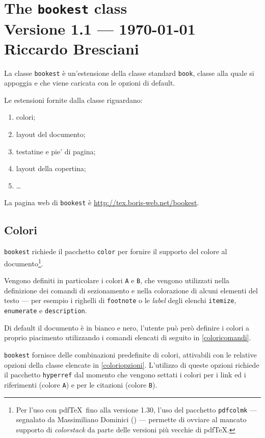\documentclass[a4paper,oneside,centered,noparindent,noparskip]{bookest}
\begin{document}
 \chapter*{The \texttt{bookest} class\\{\Large Versione 1.1 --- \today}\\{\Large Riccardo Bresciani}}
La classe \texttt{bookest} è un'estensione della classe standard \texttt{book}, classe alla quale si appoggia e che viene caricata con le opzioni di default.

\ppar
Le estensioni fornite dalla classe riguardano:
\begin{enumerate}
 \item colori;
 \item layout del documento;
 \item testatine e pie' di pagina;
 \item layout della copertina;
 \item \dots
\end{enumerate}

La pagina web di \texttt{bookest} è \url{http://tex.boris-web.net/bookest}.

\section{Colori}
\texttt{bookest} richiede il pacchetto \texttt{color} per fornire il supporto del colore al documento\footnote{Per l'uso con pdf\TeX\ fino alla versione 1.30, l'uso del pacchetto \texttt{pdfcolmk} --- segnalato da Massimiliano Dominici (\GuIT) --- permette di ovviare al mancato supporto di \emph{colorstack} da parte delle versioni più vecchie di pdf\TeX.}.

\ppar
Vengono definiti in particolare i colori \texttt{A} e \texttt{B}, che vengono utilizzati nella definizione dei comandi di sezionamento e nella colorazione di alcuni elementi del testo --- per esempio i righelli di \texttt{footnote} o le \emph{label} degli elenchi \texttt{itemize}, \texttt{enumerate} e \texttt{description}.

\ppar
Di default il documento è in bianco e nero, l'utente può però definire i colori a proprio piacimento utilizzando i comandi elencati di seguito in \ref{coloricomandi}.

\ppar
\texttt{bookest} fornisce delle combinazioni predefinite di colori, attivabili con le relative opzioni della classe elencate in \ref{coloriopzioni}. L'utilizzo di queste opzioni richiede il pacchetto \texttt{hyperref} dal momento che vengono settati i colori per i link ed i riferimenti (colore \texttt{A}) e per le citazioni (colore \texttt{B}).
\end{document}

